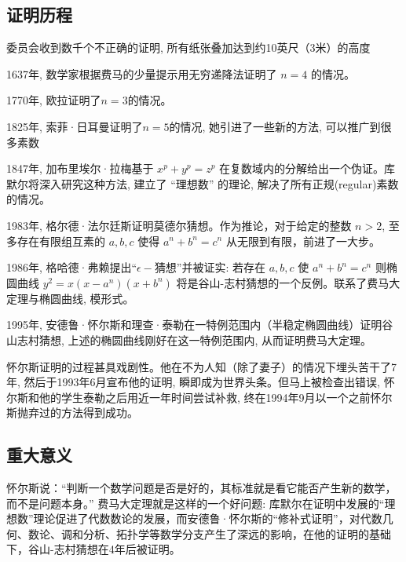 \documentclass[main]{subfiles}
\begin{document}
\subsection{证明历程}
委员会收到数千个不正确的证明, 所有纸张叠加达到约10英尺（3米）的高度
\par 1637年, 数学家根据费马的少量提示用无穷递降法证明了 $n=4$ 的情况。
\par 1770年, 欧拉证明了$n=3$的情况。
\par 1825年, 索菲·日耳曼证明了$n=5$的情况, 她引进了一些新的方法, 可以推广到很多素数
\par 1847年, 加布里埃尔·拉梅基于 $x^p + y^p = z^p$ 在复数域内的分解给出一个伪证。库默尔将深入研究这种方法, 建立了 “理想数” 的理论, 解决了所有正规(regular)素数的情况。
\par 1983年, 格尔德·法尔廷斯证明莫德尔猜想。作为推论，对于给定的整数
$n>2$, 至多存在有限组互素的
$a,b,c$ 使得
$a^{n}+b^{n}=c^{n}$ 从无限到有限，前进了一大步。
\par 1986年, 格哈德·弗赖提出“$\epsilon-$猜想”并被证实: 若存在 $a,b,c$ 使 $a^n + b^n = c^n$ 则椭圆曲线 $y^2 = x (x-a^n)(x+b^n)$ 将是谷山-志村猜想的一个反例。联系了费马大定理与椭圆曲线, 模形式。
\par 1995年, 安德鲁·怀尔斯和理查·泰勒在一特例范围内（半稳定椭圆曲线）证明谷山志村猜想, 上述的椭圆曲线刚好在这一特例范围内, 从而证明费马大定理。
\par 怀尔斯证明的过程甚具戏剧性。他在不为人知（除了妻子）的情况下埋头苦干了7年, 然后于1993年6月宣布他的证明, 瞬即成为世界头条。但马上被检查出错误, 怀尔斯和他的学生泰勒之后用近一年时间尝试补救, 终在1994年9月以一个之前怀尔斯抛弃过的方法得到成功。

\subsection{重大意义}
怀尔斯说：“判断一个数学问题是否是好的，其标准就是看它能否产生新的数学，而不是问题本身。” 费马大定理就是这样的一个好问题: 库默尔在证明中发展的“理想数”理论促进了代数数论的发展，而安德鲁·怀尔斯的“修补式证明”，对代数几何、数论、调和分析、拓扑学等数学分支产生了深远的影响，在他的证明的基础下，谷山-志村猜想在4年后被证明。
\end{document}
